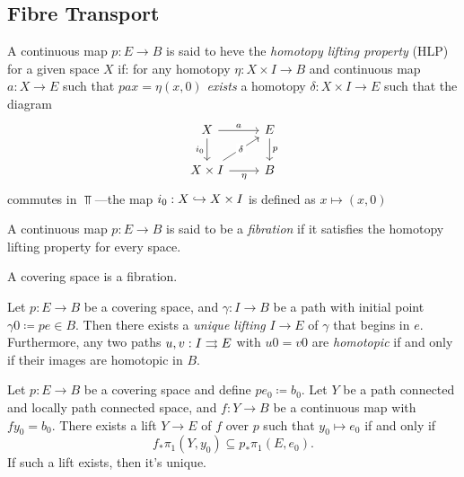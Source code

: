 \subsection{Fibre Transport}

\begin{definition}
\label{def:homotopy-lifting-property}
A continuous map \(p: E \to B\) is said to heve the \emph{homotopy lifting
  property} (HLP) for a given space \(X\) if: for any homotopy \(\eta: X \times
I \to B\) and continuous map \(a: X \to E\) such that \(p a x = \eta(x, 0)\)
\emph{exists} a homotopy \(\delta: X \times I \to E\) such that the diagram
\[
\begin{tikzcd}
X \ar[r, "a"] \ar[d, "i_0"']
&E \ar[d, "p"] \\
X \times I \ar[ru, "\delta" description]
\ar[r, "\eta"']
&B
\end{tikzcd}
\]
commutes in \(\Top\)---the map \(i_0: X \hookrightarrow X \times I\) is defined as
\(x \mapsto (x, 0)\)
\end{definition}


\begin{definition}[Fibration]
\label{def:fibration}
A continuous map \(p: E \to B\) is said to be a \emph{fibration} if it satisfies
the homotopy lifting property for every space.
\end{definition}

\begin{theorem}
\label{thm:coverings-are-fibrations}
A covering space is a fibration.
\end{theorem}


\begin{proposition}
\label{prop:path-lifting}
Let \(p: E \to B\) be a covering space, and \(\gamma: I \to B\) be a path with
initial point \(\gamma 0 \coloneq p e \in B\). Then there exists a \emph{unique
  lifting} \(I \to E\) of \(\gamma\) that begins in \(e\). Furthermore, any two
paths \(u, v: I \rightrightarrows E\) with \(u 0 = v 0\) are \emph{homotopic} if and only if
their images are homotopic in \(B\).
\end{proposition}

\begin{lemma}
\label{lem:general-lifting-lemma}
Let \(p: E \to B\) be a covering space and define \(p e_0 \coloneq b_0\). Let
\(Y\) be a path connected and locally path connected space, and \(f: Y \to B\)
be a continuous map with \(f y_0 = b_0\). There exists a lift \(Y \to E\) of
\(f\) over \(p\) such that \(y_0 \mapsto e_0\) if and only if
\[
f_{*} \pi_1(Y, y_0) \subseteq p_{*} \pi_1(E, e_0).
\]
If such a lift exists, then it's unique.
\end{lemma}

